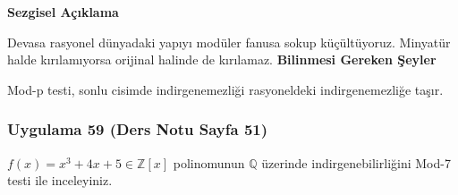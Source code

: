 \documentclass[11pt, a4paper]{article}
\newenvironment{sezgisel}{
    \vspace{0.5cm}
    \noindent\textcolor{orange!80!black}{\faLightbulb\enspace \textbf{\Large Sezgisel Açıklama}}\par\vspace{0.2cm}
    \itshape
}{}
\newenvironment{bilgi}{
    \vspace{0.5cm}
    \noindent\textcolor{red!70!black}{\faExclamationTriangle\enspace \textbf{\Large Bilinmesi Gereken Şeyler}}\par\vspace{0.2cm}
}{}
\begin{document}
\begin{sezgisel}
Devasa rasyonel dünyadaki yapıyı modüler fanusa sokup küçültüyoruz. Minyatür halde kırılamıyorsa orijinal halinde de kırılamaz.
\end{sezgisel}
\begin{bilgi}
Mod-p testi, sonlu cisimde indirgenemezliği rasyoneldeki indirgenemezliğe taşır.
\end{bilgi}

\newpage
\subsubsection{Uygulama 59 (Ders Notu Sayfa 51)}
\begin{sorubox}
$f(x)=x^3+4x+5 \in \mathbb{Z}[x]$ polinomunun $\mathbb{Q}$ üzerinde indirgenebilirliğini Mod-7 testi ile inceleyiniz.
\end{sorubox}
\end{document}
